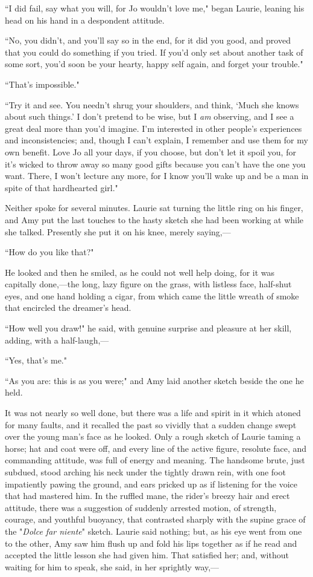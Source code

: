 ``I did fail, say what you will, for Jo wouldn't love
me," began Laurie, leaning his head on his hand in a despondent
attitude.

``No, you didn't, and you'll say so in
the end, for it did you good, and proved that you could do something if
you tried. If you'd only set about another task of some
sort, you'd soon be your hearty, happy self again, and
forget your trouble."

``That's impossible."

``Try it and see. You needn't shrug your shoulders, and
think, `Much she knows about such
things.' I don't pretend to be wise,
but I \emph{am} observing, and I see a great deal more than
you'd imagine. I'm interested in other
people's experiences and inconsistencies; and, though I
can't explain, I remember and use them for my own
benefit. Love Jo all your days, if you choose, but don't
let it spoil you, for it's wicked to throw away so many
good gifts because you can't have the one you want.
There, I won't lecture any more, for I know
you'll wake up and be a man in spite of that hardhearted
girl."

Neither spoke for several minutes. Laurie sat turning the little ring on
his finger, and Amy put the last touches to the hasty sketch she had
been working at while she talked. Presently she put it on his knee,
merely saying,---

``How do you like that?"

He looked and then he smiled, as he could not well help doing, for it
was capitally done,---the long, lazy figure on the grass, with listless
face, half-shut eyes, and one hand holding a cigar, from which came the
little wreath of smoke that encircled the dreamer's
head.

``How well you draw!" he said, with genuine surprise and pleasure at her
skill, adding, with a half-laugh,---

``Yes, that's me."

``As you are: this is as you were;" and Amy laid another sketch beside
the one he held.

It was not nearly so well done, but there was a life and spirit in it
which atoned for many faults, and it recalled the past so vividly that a
sudden change swept over the young man's face as he
looked. Only a rough sketch of Laurie taming a horse; hat and coat were
off, and every line of the active figure, resolute face, and commanding
attitude, was full of energy and meaning. The handsome brute, just
subdued, stood arching his neck under the tightly drawn rein, with one
foot impatiently pawing the ground, and ears pricked up as if listening
for the voice that had mastered him. In the ruffled mane, the
rider's breezy hair and erect attitude, there was a
suggestion of suddenly arrested motion, of strength, courage, and
youthful buoyancy, that contrasted sharply with the supine grace of the
"\emph{Dolce far niente}" sketch. Laurie said nothing; but, as his eye
went from one to the other, Amy saw him flush up and fold his lips
together as if he read and accepted the little lesson she had given him.
That satisfied her; and, without waiting for him to speak, she said, in
her sprightly way,---

